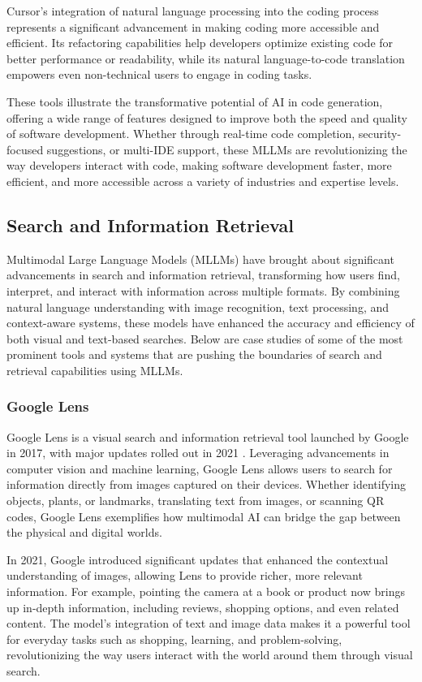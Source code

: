 Cursor's integration of natural language processing into the coding process represents a significant advancement in making coding more accessible and efficient. Its refactoring capabilities help developers optimize existing code for better performance or readability, while its natural language-to-code translation empowers even non-technical users to engage in coding tasks.

These tools illustrate the transformative potential of AI in code generation, offering a wide range of features designed to improve both the speed and quality of software development. Whether through real-time code completion, security-focused suggestions, or multi-IDE support, these MLLMs are revolutionizing the way developers interact with code, making software development faster, more efficient, and more accessible across a variety of industries and expertise levels.

\subsection{Search and Information Retrieval}

Multimodal Large Language Models (MLLMs) have brought about significant advancements in search and information retrieval, transforming how users find, interpret, and interact with information across multiple formats. 
By combining natural language understanding with image recognition, text processing, and context-aware systems, these models have enhanced the accuracy and efficiency of both visual and text-based searches. 
Below are case studies of some of the most prominent tools and systems that are pushing the boundaries of search and retrieval capabilities using MLLMs.

\subsubsection{Google Lens}

Google Lens is a visual search and information retrieval tool launched by Google in 2017, with major updates rolled out in 2021 \cite{GoogleLens}. 
Leveraging advancements in computer vision and machine learning, Google Lens allows users to search for information directly from images captured on their devices. 
Whether identifying objects, plants, or landmarks, translating text from images, or scanning QR codes, Google Lens exemplifies how multimodal AI can bridge the gap between the physical and digital worlds.

In 2021, Google introduced significant updates that enhanced the contextual understanding of images, allowing Lens to provide richer, more relevant information. 
For example, pointing the camera at a book or product now brings up in-depth information, including reviews, shopping options, and even related content. 
The model's integration of text and image data makes it a powerful tool for everyday tasks such as shopping, learning, and problem-solving, revolutionizing the way users interact with the world around them through visual search.


